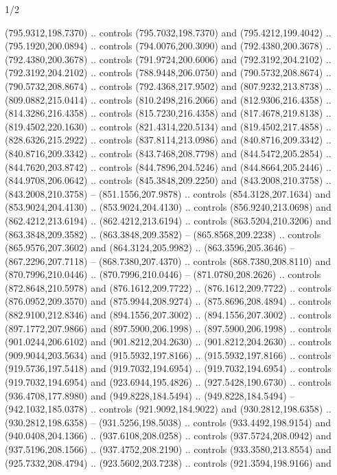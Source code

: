 \begin{flagdescription}{1/2}
\begin{scope}[xshift=0.75\flaglength,yshift=0.5\flagwidth,scale=0.00293\flagwidth]
\begin{scope}[scale=0.675,y=0.80pt, x=0.80pt,yscale=-1,xshift=-720,yshift=-240]
\begin{scope}[miter limit=4.80]
\begin{scope}[miter limit=3.00]
  (795.9312,198.7370) .. controls (795.7032,198.7370) and (795.4212,199.4042) ..
  (795.1920,200.0894) .. controls (794.0076,200.3090) and (792.4380,200.3678) ..
  (792.4380,200.3678) .. controls (791.9724,200.6006) and (792.3192,204.2102) ..
  (792.3192,204.2102) .. controls (788.9448,206.0750) and (790.5732,208.8674) ..
  (790.5732,208.8674) .. controls (792.4368,217.9502) and (807.9232,213.8738) ..
  (809.0882,215.0414) .. controls (810.2498,216.2066) and (812.9306,216.4358) ..
  (814.3286,216.4358) .. controls (815.7230,216.4358) and (817.4678,219.8138) ..
  (819.4502,220.1630) .. controls (821.4314,220.5134) and (819.4502,217.4858) ..
  (828.6326,215.2922) .. controls (837.8114,213.0986) and (840.8716,209.3342) ..
  (840.8716,209.3342) .. controls (843.7468,208.7798) and (844.5472,205.2854) ..
  (844.7620,203.8742) .. controls (844.7896,204.5246) and (844.8664,205.2446) ..
  (844.9708,206.0642) .. controls (845.3848,209.2250) and (843.2008,210.3758) ..
  (843.2008,210.3758) -- (851.1556,207.9878) .. controls (854.3128,207.1634) and
  (853.9024,204.4130) .. (853.9024,204.4130) .. controls (856.9240,213.0698) and
  (862.4212,213.6194) .. (862.4212,213.6194) .. controls (863.5204,210.3206) and
  (863.3848,209.3582) .. (863.3848,209.3582) -- (865.8568,209.2238) .. controls
  (865.9576,207.3602) and (864.3124,205.9982) .. (863.3596,205.3646) --
  (867.2296,207.7118) -- (868.7380,207.4370) .. controls (868.7380,208.8110) and
  (870.7996,210.0446) .. (870.7996,210.0446) -- (871.0780,208.2626) .. controls
  (872.8648,210.5978) and (876.1612,209.7722) .. (876.1612,209.7722) .. controls
  (876.0952,209.3570) and (875.9944,208.9274) .. (875.8696,208.4894) .. controls
  (882.9100,212.8346) and (894.1556,207.3002) .. (894.1556,207.3002) .. controls
  (897.1772,207.9866) and (897.5900,206.1998) .. (897.5900,206.1998) .. controls
  (901.0244,206.6102) and (901.8212,204.2630) .. (901.8212,204.2630) .. controls
  (909.9044,203.5634) and (915.5932,197.8166) .. (915.5932,197.8166) .. controls
  (919.5736,197.5418) and (919.7032,194.6954) .. (919.7032,194.6954) .. controls
  (919.7032,194.6954) and (923.6944,195.4826) .. (927.5428,190.6730) .. controls
  (936.4708,177.8980) and (949.8228,184.5494) .. (949.8228,184.5494) --
  (942.1032,185.0378) .. controls (921.9092,184.9022) and (930.2812,198.6358) ..
  (930.2812,198.6358) -- (931.5256,198.5038) .. controls (933.4492,198.9154) and
  (940.0408,204.1366) .. (937.6108,208.0258) .. controls (937.5724,208.0942) and
  (937.5196,208.1566) .. (937.4752,208.2190) .. controls (933.3580,213.8554) and
  (925.7332,208.4794) .. (923.5602,203.7238) .. controls (921.3594,198.9166) and

\end{scope}
\end{scope}
\end{scope}
\end{scope}
\end{flagdescription}
